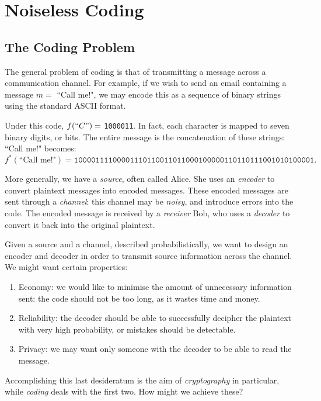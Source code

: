 \documentclass{article}
\begin{document}
\makecover

\section{Noiseless Coding}
\subsection{The Coding Problem}

The general problem of coding is that of transmitting a message across a communication channel. For example, if we wish to send an email containing a message $m =$ ``Call me!", we may encode this as a sequence of binary strings using the standard ASCII format.

Under this code, $f(``C") =$ \texttt{1000011}. In fact, each character is mapped to seven binary digits, or bits. The entire message is the concatenation of these strings: ``Call me!" becomes:
\[
f^*(\text{``Call me!"}) = \texttt{10000111100001110110011011000100000110110111001010100001}.
\]

\begin{definition}
	\label{source-encoder-channel-receiver-decoder}
    More generally, we have a \textit{source}, often called Alice. She uses an \textit{encoder} to convert plaintext messages into encoded messages. These encoded messages are sent through a \textit{channel}: this channel may be \textit{noisy}, and introduce errors into the code. The encoded message is received by a \textit{receiver} Bob, who uses a \textit{decoder} to convert it back into the original plaintext.
\end{definition}

Given a source and a channel, described probabilistically, we want to design an encoder and decoder in order to transmit source information across the channel. We might want certain properties:
\begin{enumerate}
    \item Economy: we would like to minimise the amount of unnecessary information sent: the code should not be too long, as it wastes time and money.
    \item Reliability: the decoder should be able to successfully decipher the plaintext with very high probability, or mistakes should be detectable.
    \item Privacy: we may want only someone with the decoder to be able to read the message.
\end{enumerate}
Accomplishing this last desideratum is the aim of \textit{cryptography} in particular, while \textit{coding} deals with the first two. How might we achieve these?
\end{document}
